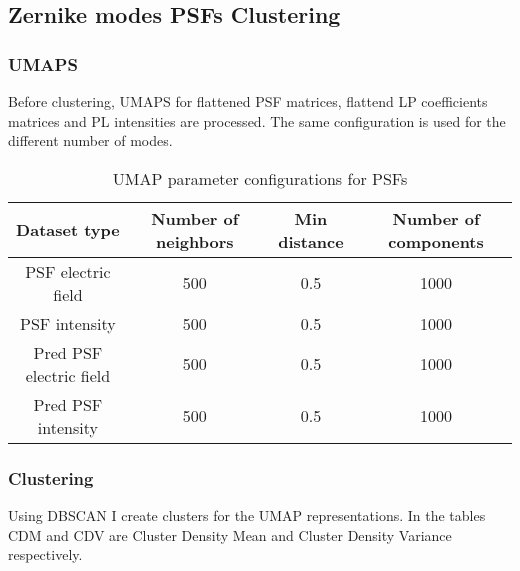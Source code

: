 \subsection{Zernike modes PSFs Clustering}

	\subsubsection{UMAPS}
		
		Before clustering, UMAPS for flattened PSF matrices, flattend LP coefficients matrices and PL intensities are processed. The same configuration is used for the different number of modes.
		
		\begin{table}[h!]
			\centering
			\begin{tabular}{|c|c|c|c|}
				\hline
				\textbf{Dataset type} & \textbf{Number of neighbors} & \textbf{Min distance} & \textbf{Number of components} \\
				\hline
				PSF electric field & 500 & 0.5 & 1000 \\
				\hline
				PSF intensity & 500 & 0.5 & 1000 \\
				\hline
				Pred PSF electric field & 500 & 0.5 & 1000 \\
				\hline
				Pred PSF intensity & 500 & 0.5 & 1000 \\
				\hline
			\end{tabular}
		\caption{UMAP parameter configurations for PSFs}
		\end{table}
		
	
	\subsubsection{Clustering}
		
		Using DBSCAN I create clusters for the UMAP representations. In the tables CDM and CDV are Cluster Density Mean and Cluster Density Variance respectively.
		
